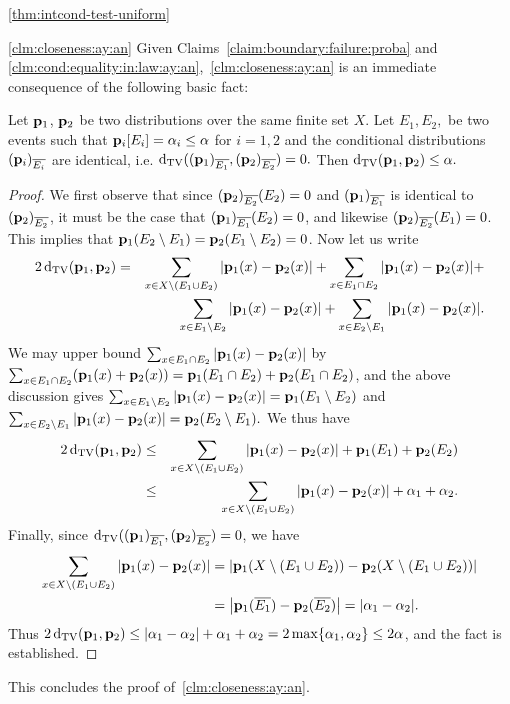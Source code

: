 \begin{proofof}{\cref{thm:intcond-test-uniform}}
\begin{proofof}{\cref{clm:closeness:ay:an}}
Given Claims~\ref{claim:boundary:failure:proba}
and \ref{clm:cond:equality:in:law:ay:an},~\cref{clm:closeness:ay:an}
is an immediate consequence of the following basic fact:


\begin{fact} \label{fact:dtv-condit}
Let $\mathbf{p}_1$, $\mathbf{p}_2$ be two distributions over the same finite set $X$.  Let
$E_1,E_2,$ be two events such that
$\mathbf{p}_i[E_i] = \alpha_i \leq \alpha$ for $i=1,2$ and the conditional
distributions $(\mathbf{p}_i)_{\overline{E_i}}$ are identical, i.e.
$\operatorname{d}_{\textrm{TV}}(
(\mathbf{p}_1)_{\overline{E_1}},
(\mathbf{p}_2)_{\overline{E_2}}
)=0.$
Then $\operatorname{d}_{\textrm{TV}}(\mathbf{p}_1,\mathbf{p}_2) \leq \alpha.$
\end{fact}
\begin{proof}
We first observe that since $(\mathbf{p}_2)_{\overline{E_2}}(E_2)=0$ and
$(\mathbf{p}_1)_{\overline{E_1}}$ is identical to $(\mathbf{p}_2)_{\overline{E_2}}$, it must be
the case that $(\mathbf{p}_1)_{\overline{E_1}}(E_2)=0$, and likewise
$(\mathbf{p}_2)_{\overline{E_2}}(E_1)=0$.  This implies that
$\mathbf{p}_1(E_2 \setminus E_1) = \mathbf{p}_2(E_1 \setminus E_2)=0$.
Now let us write
\begin{eqnarray*}
2\operatorname{d}_{\textrm{TV}}(\mathbf{p}_1,\mathbf{p}_2)
&=&\sum_{x \in X \setminus (E_1 \cup E_2)} |\mathbf{p}_1(x)-\mathbf{p}_2(x)| +
\sum_{x \in  E_1 \cap E_2} |\mathbf{p}_1(x)-\mathbf{p}_2(x)| + \\
&&\sum_{x \in E_1 \setminus E_2} |\mathbf{p}_1(x)-\mathbf{p}_2(x)| +
\sum_{x \in E_2 \setminus E_1} |\mathbf{p}_1(x)-\mathbf{p}_2(x)|.\\
\end{eqnarray*}
We may upper bound
$\sum_{x \in  E_1 \cap E_2} |\mathbf{p}_1(x)-\mathbf{p}_2(x)|$ by
$\sum_{x \in  E_1 \cap E_2} (\mathbf{p}_1(x) + \mathbf{p}_2(x)) =
\mathbf{p}_1(E_1 \cap E_2) + \mathbf{p}_2(E_1 \cap E_2)$,
and the above discussion gives
$\sum_{x \in E_1 \setminus E_2} |\mathbf{p}_1(x)-\mathbf{p}_2(x)| =
\mathbf{p}_1(E_1 \setminus E_2)$ and
$\sum_{x \in E_2 \setminus E_1} |\mathbf{p}_1(x)-\mathbf{p}_2(x)| = \mathbf{p}_2(E_2 \setminus E_1).$
We thus have
\begin{eqnarray*}
2\operatorname{d}_{\textrm{TV}}(\mathbf{p}_1,\mathbf{p}_2)
&\leq&
\sum_{x \in X \setminus (E_1 \cup E_2)} |\mathbf{p}_1(x)-\mathbf{p}_2(x)| +
\mathbf{p}_1(E_1) + \mathbf{p}_2(E_2)\\
&\leq&\sum_{x \in X \setminus (E_1 \cup E_2)} |\mathbf{p}_1(x)-\mathbf{p}_2(x)| +
\alpha_1 + \alpha_2.
\end{eqnarray*}
Finally, since $\operatorname{d}_{\textrm{TV}}((\mathbf{p}_1)_{\overline{E_1}},(\mathbf{p}_2)_{\overline{E_2}})=0$, we
have
\begin{align*}
\sum_{x \in X \setminus (E_1 \cup E_2)} |\mathbf{p}_1(x)-\mathbf{p}_2(x)|
&= \left\lvert  \mathbf{p}_1(X \setminus (E_1 \cup E_2)) - \mathbf{p}_2(X \setminus (E_1 \cup E_2))  \right\rvert\\
&= \left\lvert  \mathbf{p}_1(\overline{E_1}) - \mathbf{p}_2(\overline{E_2})  \right\rvert = |\alpha_1 - \alpha_2|.
\end{align*}
Thus $2 \operatorname{d}_{\textrm{TV}}(\mathbf{p}_1,\mathbf{p}_2) \leq |\alpha_1 - \alpha_2| + \alpha_1 + \alpha_2 =
2 \max\{\alpha_1,\alpha_2\} \leq 2 \alpha$, and the fact is established.
\end{proof}
\noindent This concludes the proof of~\cref{clm:closeness:ay:an}.
\end{proofof}


\end{proofof}
